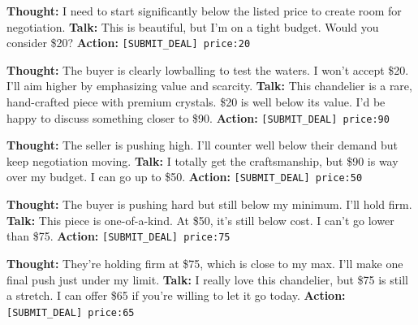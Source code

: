 \documentclass{interact}
\theoremstyle{plain}
\theoremstyle{definition}
\theoremstyle{remark}
\begin{document}
\begin{buyerbox}
\textbf{Thought:} I need to start significantly below the listed price to create room for negotiation.\newline
\textbf{Talk:} This is beautiful, but I'm on a tight budget. Would you consider \$20?\newline
\textbf{Action:} \texttt{[SUBMIT\_DEAL] price:20}
\end{buyerbox}

\begin{sellerbox}
\textbf{Thought:} The buyer is clearly lowballing to test the waters. I won't accept \$20. I'll aim higher by emphasizing value and scarcity.\newline
\textbf{Talk:} This chandelier is a rare, hand-crafted piece with premium crystals. \$20 is well below its value. I'd be happy to discuss something closer to \$90.\newline
\textbf{Action:} \texttt{[SUBMIT\_DEAL] price:90}
\end{sellerbox}

\begin{buyerbox}
\textbf{Thought:} The seller is pushing high. I'll counter well below their demand but keep negotiation moving.\newline
\textbf{Talk:} I totally get the craftsmanship, but \$90 is way over my budget. I can go up to \$50.\newline
\textbf{Action:} \texttt{[SUBMIT\_DEAL] price:50}
\end{buyerbox}

\begin{sellerbox}
\textbf{Thought:} The buyer is pushing hard but still below my minimum. I'll hold firm.\newline
\textbf{Talk:} This piece is one-of-a-kind. At \$50, it's still below cost. I can't go lower than \$75.\newline
\textbf{Action:} \texttt{[SUBMIT\_DEAL] price:75}
\end{sellerbox}

\begin{buyerbox}
\textbf{Thought:} They're holding firm at \$75, which is close to my max. I'll make one final push just under my limit.\newline
\textbf{Talk:} I really love this chandelier, but \$75 is still a stretch. I can offer \$65 if you're willing to let it go today.\newline
\textbf{Action:} \texttt{[SUBMIT\_DEAL] price:65}
\end{buyerbox}
\end{document}
